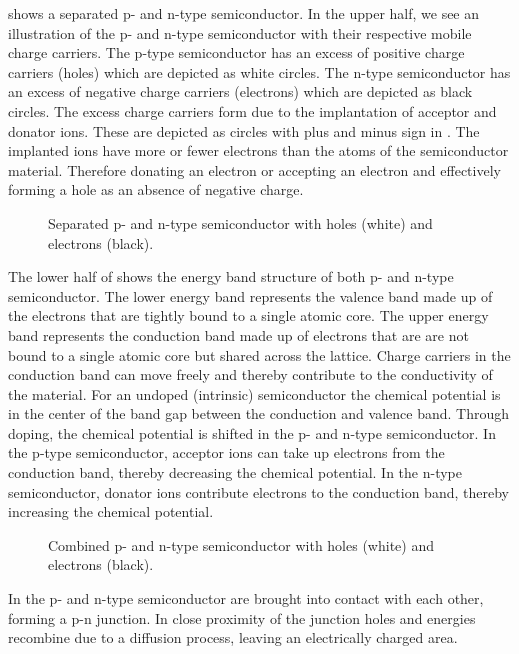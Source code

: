  shows a separated p- and n-type semiconductor.
In the upper half, we see an illustration of the p- and n-type semiconductor with their respective mobile charge carriers.
The p-type semiconductor has an excess of positive charge carriers (holes) which are depicted as white circles.
The n-type semiconductor has an excess of negative charge carriers (electrons) which are depicted as black circles.
The excess charge carriers form due to the implantation of acceptor and donator ions.
These are depicted as circles with plus and minus sign in .
The implanted ions have more or fewer electrons than the atoms of the semiconductor material.
Therefore donating an electron or accepting an electron and effectively forming a hole as an absence of negative charge.
\begin{figure}[H]
	\centering
	
	\caption{Separated p- and n-type semiconductor with holes (white) and electrons (black).}\label{fig:pn_junction_separated}
\end{figure}
The lower half of  shows the energy band structure of both p- and n-type semiconductor.
The lower energy band represents the valence band made up of the electrons that are tightly bound to a single atomic core.
The upper energy band represents the conduction band made up of electrons that are are not bound to a single atomic core but shared across the lattice.
Charge carriers in the conduction band can move freely and thereby contribute to the conductivity of the material.
For an undoped (intrinsic) semiconductor the chemical potential is in the center of the band gap between the conduction and valence band.
Through doping, the chemical potential is shifted in the p- and n-type semiconductor.
In the p-type semiconductor, acceptor ions can take up electrons from the conduction band, thereby decreasing the chemical potential.
In the n-type semiconductor, donator ions contribute electrons to the conduction band, thereby increasing the chemical potential.
\begin{figure}[H]
	\centering
	
	\caption{Combined p- and n-type semiconductor with holes (white) and electrons (black).}\label{fig:pn_junction_combined}
\end{figure}
In  the p- and n-type semiconductor are brought into contact with each other, forming a p-n junction.
In close proximity of the junction holes and energies recombine due to a diffusion process, leaving an electrically charged area.
